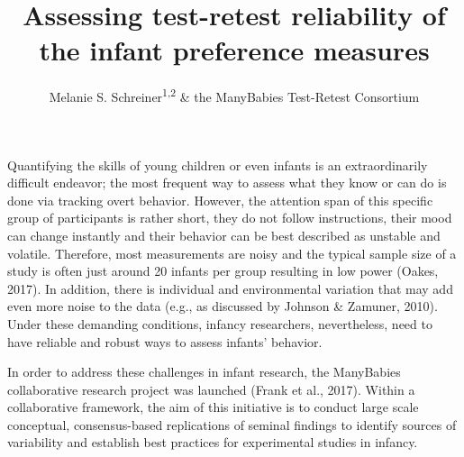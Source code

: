 \documentclass[
  english,
  man,floatsintext]{apa6}
\title{Assessing test-retest reliability of the infant preference measures}
\author{Melanie S. Schreiner\textsuperscript{1,2} \& the ManyBabies Test-Retest Consortium\textsuperscript{}}
\date{}
\affiliation{\vspace{0.5cm}\textsuperscript{1} University of Goettingen\\\textsuperscript{2} Leibniz Science Campus PrimateCognition}
\begin{document}
\maketitle

Quantifying the skills of young children or even infants is an extraordinarily difficult endeavor; the most frequent way to assess what they know or can do is done via tracking overt behavior. However, the attention span of this specific group of participants is rather short, they do not follow instructions, their mood can change instantly and their behavior can be best described as unstable and volatile. Therefore, most measurements are noisy and the typical sample size of a study is often just around 20 infants per group resulting in low power (Oakes, 2017). In addition, there is individual and environmental variation that may add even more noise to the data (e.g., as discussed by Johnson \& Zamuner, 2010). Under these demanding conditions, infancy researchers, nevertheless, need to have reliable and robust ways to assess infants' behavior.

In order to address these challenges in infant research, the ManyBabies collaborative research project was launched (Frank et al., 2017). Within a collaborative framework, the aim of this initiative is to conduct large scale conceptual, consensus-based replications of seminal findings to identify sources of variability and establish best practices for experimental studies in infancy.
\end{document}
